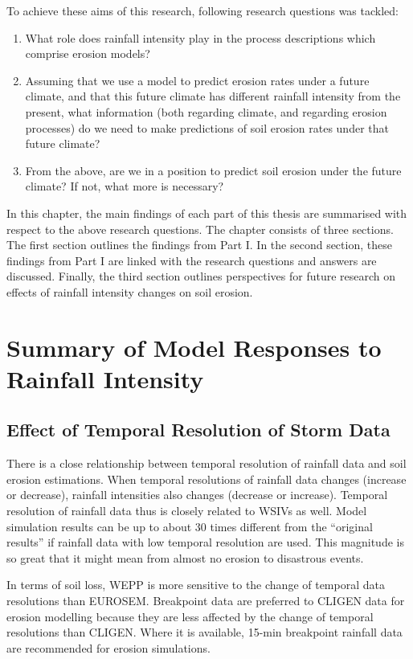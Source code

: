 To achieve these aims of this research, following research questions was
tackled:
\begin{enumerate}[{Question} 1.]
  \item What role does rainfall intensity play in the process descriptions which
comprise erosion models?
  \item Assuming that we use a model to predict erosion rates under a future
climate, and that this future climate has different rainfall intensity from the
present, what information (both regarding climate, and regarding erosion
processes) do we need to make predictions of soil erosion rates under that
future climate?
  \item From the above, are we in a position to predict soil erosion under the
future climate? If not, what more is necessary?
\end{enumerate}

In this chapter, the main findings of each part of this thesis are summarised
with respect to the above research questions. The chapter consists of three
sections. The first section outlines the findings from Part I. In the
second section, these findings from Part I are linked with the research
questions and answers are discussed. Finally, the third section outlines
perspectives for future research on effects of rainfall intensity changes on
soil erosion.

\section{Summary of Model Responses to Rainfall Intensity}
\label{sec:SummaryofModelResponsestoRainfallIntensityChange}

\subsection{Effect of Temporal Resolution of Storm Data}
There is a close relationship between temporal resolution of rainfall data
and soil erosion estimations. When temporal resolutions of rainfall data
changes (increase or decrease), rainfall intensities also changes (decrease or
increase). Temporal resolution of rainfall data thus is closely related to WSIVs
as well. Model simulation results can be up to about 30 times different from
the ``original results'' if rainfall data with low temporal resolution are used.
This magnitude is so great that it might mean from almost no erosion to
disastrous events.

In terms of soil loss, WEPP is more sensitive to the change of temporal
data resolutions than EUROSEM. Breakpoint data are preferred to CLIGEN data
for erosion modelling because they are less affected by the change of temporal
resolutions than CLIGEN. Where it is available, 15-min breakpoint rainfall data
are recommended for erosion simulations.

